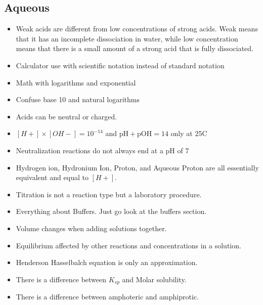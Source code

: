     \subsection{Aqueous}
        \begin{itemize}
            \item Weak acids are different from low concentrations of strong acids. Weak means that it has an incomplete dissociation in water, while low concentration means that there is a small amount of a strong acid that is fully dissociated.
            \item Calculator use with scientific notation instead of standard notation
            \item Math with logarithms and exponential
            \item Confuse base 10 and natural logarithms
            \item Acids can be neutral or charged.
            \item $[H+]\times[OH-]=10^{-14}$ and $\text{pH} + \text{pOH} =14$ only at 25\textdegree C
            \item Neutralization reactions do not always end at a pH of 7
            \item Hydrogen ion, Hydronium Ion, Proton, and Aqueous Proton are all essentially equivalent and equal to $[H+]$. 
            \item Titration is not a reaction type but a laboratory procedure. 
            \item Everything about Buffers. Just go look at the buffers section.
            \item Volume changes when adding solutions together.
            \item Equilibrium affected by other reactions and concentrations in a solution. 
            \item Henderson Hasselbalch equation is only an approximation.
            \item There is a difference between $K_{sp}$ and Molar solubility.
            \item There is a difference between amphoteric and amphiprotic.
        \end{itemize}
